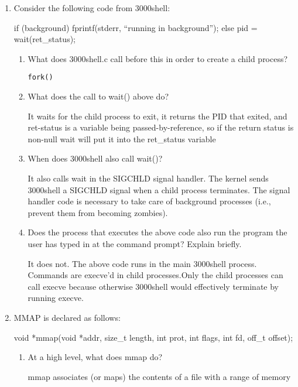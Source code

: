 \begin{enumerate}
\item Consider the following code from 3000shell:
\begin{csrc}
if (background) {
  fprintf(stderr, ``running in background'');
} else {
  pid = wait(ret_status);
}
\end{csrc}
  \begin{enumerate}
  \item What does 3000shell.c call before this in order to create a child
    process?
    \begin{ans}
      \texttt{fork()}
    \end{ans}
  \item What does the call to wait() above do?
    \begin{ans}
      It waits for the child process to exit, it returns the PID that exited,
      and ret-status is a variable being passed-by-reference, so if the return
      status is non-null wait will put it into the ret\_status variable
    \end{ans}
  \item When does 3000shell also call wait()?
    \begin{ans}
       It also calls wait in the SIGCHLD signal handler. The kernel sends 3000shell a SIGCHLD signal when
a child process terminates. The signal handler code is necessary to take care of background processes (i.e.,
prevent them from becoming zombies).
    \end{ans}
  \item Does the process that executes the above code also run the program the
    user has typed in at the command prompt? Explain briefly.
    \begin{ans}
      It does not. The above code runs in the main 3000shell process. Commands are execve’d in child processes.Only the child processes can call execve because otherwise 3000shell would effectively terminate by running
execve.
    \end{ans}
  \end{enumerate}
\item MMAP is declared as follows:
\begin{csrc}
void *mmap(void *addr, size_t length, int prot, int flags,
                  int fd, off_t offset);
\end{csrc}
  \begin{enumerate}
  \item At a high level, what does mmap do?
    \begin{ans}
      mmap associates (or maps) the contents of a file with a range of memory

\end{ans}
\end{enumerate}
\end{enumerate}
